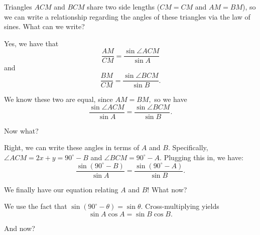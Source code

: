 
Triangles $ACM$ and $BCM$ share two side lengths ($CM = CM$ and $AM = BM$), so we can write a relationship regarding the angles of these triangles via the law of sines.  What can we write?


Yes, we have that $$\frac{AM}{CM} = \frac{\sin \angle ACM}{\sin A}$$ and $$\frac{BM}{CM} = \frac{\sin \angle BCM}{\sin B}.$$

We know these two are equal, since $AM = BM,$ so we have $$\frac{\sin \angle ACM}{\sin A} = \frac{\sin \angle BCM}{\sin B}.$$

Now what?


Right, we can write these angles in terms of $A$ and $B.$ Specifically, $\angle ACM = 2x + y = 90^{\circ} - B$ and $\angle BCM = 90^{\circ} - A.$ Plugging this in, we have: $$\frac{\sin{(90^{\circ}-B)}}{\sin A} = \frac{\sin{(90^{\circ}-A)}}{\sin B}.$$

We finally have our equation relating $A$ and $B!$ What now?



We use the fact that $\sin(90^{\circ} - \theta) = \sin \theta.$ Cross-multiplying yields $$\sin A \cos A = \sin B \cos B.$$

And now?


